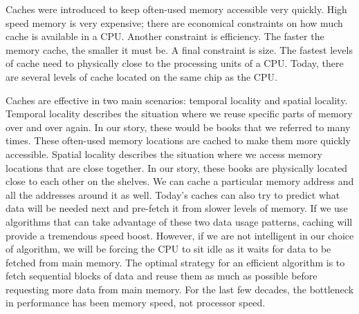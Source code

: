 Caches were introduced to keep often-used memory accessible very quickly.  High speed memory is very expensive; there are economical constraints on how much cache is available in a CPU.
Another constraint is efficiency.  The faster the memory cache, the smaller it must be.
A final constraint is size.  The fastest levels of cache need to physically close to the processing units of a CPU.
Today, there are several levels of cache located on the same chip as the CPU.

Caches are effective in two main scenarios: temporal locality and spatial locality.
Temporal locality describes the situation where we reuse specific parts of memory over and over again.
In our story, these would be books that we referred to many times.
These often-used memory locations are cached to make them more quickly accessible.
Spatial locality describes the situation where we access memory locations that are close together.
In our story, these books are physically located close to each other on the shelves.
We can cache a particular memory address and all the addresses around it as well.
Today's caches can also try to predict what data will be needed next and pre-fetch it from slower levels of memory.
If we use algorithms that can take advantage of these two data usage patterns, caching will provide a tremendous speed boost.
However, if we are not intelligent in our choice of algorithm, we will be forcing the CPU to sit idle as it waits for data to be fetched from main memory.
The optimal strategy for an efficient algorithm is to fetch sequential blocks of data and reuse them as much as possible before requesting more data from main memory.
For the last few decades, the bottleneck in performance has been memory speed, not processor speed.

